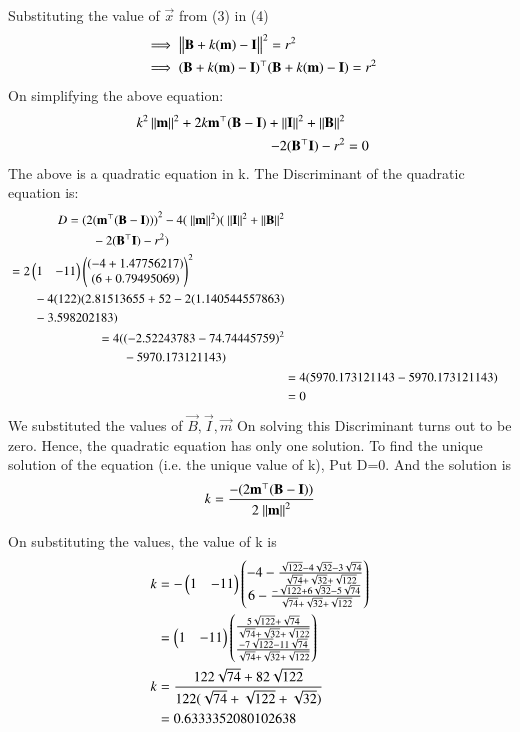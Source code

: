 \documentclass[journal,12pt,twocolumn]{IEEEtran}
\theoremstyle{remark}
\begin{document}
Substituting the value of $ \vec{x} $ from (3) in (4)
\begin{align}
  &\implies\left\lVert \mathbf{B} + k(\mathbf{m})- \mathbf{I} \right\rVert^2 = r^2 \\
  &\implies(\mathbf{B} + k(\mathbf{m})- \mathbf{I})^{\top} (\mathbf{B} + k(\mathbf{m})- \mathbf{I}) = r^2 
\end{align}
On simplifying the above equation:
\begin{align}
\begin{split}
k^2\left\lVert\mathbf{m}\right\rVert^2 +2k{\mathbf{m}^{\top}}({\mathbf{B}-\mathbf{I}})+\left\lVert\mathbf{I}\right\rVert^2 +\left\lVert\mathbf{B}\right\rVert^2\\-2(\mathbf{B}^{\top}\mathbf{I}) - r^2&=0
\end{split}
\end{align}
The above is a quadratic equation in k.
The Discriminant of the quadratic equation is:
\begin{align}
\begin{split}
D &= {(2(\vec{m}^{\top}({\vec{B}-\vec{I}})))}^2-4(\ \norm{\vec{m}}^2)(\ \norm{\vec{I}}^2 +\norm{\vec{B}}^2\\&\qquad-2(\vec{B}^{\top}\vec{I}) - r^2)
\end{split}\nonumber\\
\begin{split}
&={2\myvec{1&-11}\myvec{(-4+1.47756217)\\(6+0.79495069)}}^2 \\&\qquad-4(122)(2.81513655+52-2(1.140544557863)\\&\qquad-3.598202183)
\end{split}\nonumber\\
\begin{split}
&=4({(-2.52243783-74.74445759)}^2\\&\qquad-5970.173121143)
\end{split}\nonumber\\
&=4(5970.173121143-5970.173121143)\nonumber\\
&=0
\end{align}
We substituted the values of $\vec{B},\vec{I},\vec{m}$
On solving this Discriminant turns out to be zero.
Hence, the quadratic equation has only one solution.
To find the unique solution of the equation (i.e. the unique value of k), Put D=0.
And the solution is \begin{align}k=\frac{-(2\mathbf{m}^{\top}({\mathbf{B}-\mathbf{I}}))}{2{\ \left\lVert\mathbf{m}\right\rVert^2}}\end{align}

On substituting the values, the value of k is 
\begin{align}
k&=-\begin{pmatrix}1&-11\end{pmatrix}\begin{pmatrix}-4-\frac{\sqrt{122}-4\sqrt{32}-3\sqrt{74}}{\sqrt{74}+\sqrt{32}+\sqrt{122}}\\6-\frac{-\sqrt{122}+6\sqrt{32}-5\sqrt{74}}{\sqrt{74}+\sqrt{32}+\sqrt{122}}\end{pmatrix}\nonumber\\
&=\begin{pmatrix}1&-11\end{pmatrix}\begin{pmatrix}\frac{5\sqrt{122}+\sqrt{74}}{\sqrt{74}+\sqrt{32}+\sqrt{122}}\\\frac{-7\sqrt{122}-11\sqrt{74}}{\sqrt{74}+\sqrt{32}+\sqrt{122}}\end{pmatrix}\nonumber\\
k&=\frac{122\sqrt{74}+82\sqrt{122}}{122(\sqrt{74}+\sqrt{122}+\sqrt{32})}\\
&=0.6333352080102638\nonumber
\end{align}
\end{document}
